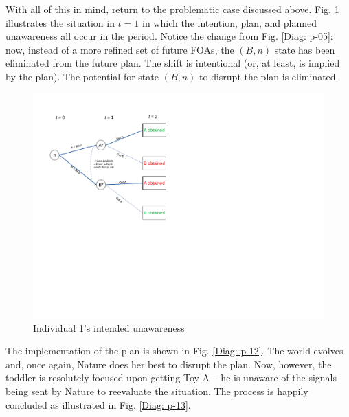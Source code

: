 \documentclass[
11pt,
titlepage,
reqno,
]{article}%
\theoremstyle{definition}
\begin{document}
With all of this in mind, return to the problematic case discussed above. Fig. \ref{Diag: p-11} illustrates the situation in $t=1$ in which the intention, plan, and planned unawareness all occur in the period. Notice the change from Fig. \ref{Diag: p-05}: now, instead of a more refined set of future FOAs, the  $(B,n)$ state has been eliminated from the future plan. The shift is intentional (or, at least, is implied by the plan). The potential for state $(B,n)$ to disrupt the plan is eliminated. 

\begin{figure}[h!]
	\centering
	\includegraphics*[page=11,trim = 0in 4in 3in 0in,scale=.65]{Awareness_Diagrams_All}
	\caption{Individual 1's intended unawareness\label{Diag: p-11}}%
\end{figure}

The implementation of the plan is shown in Fig. \ref{Diag: p-12}. The world evolves and, once again, Nature does her best to disrupt the plan. Now, however, the toddler is resolutely focused upon getting Toy A -- he is unaware of the signals being sent by Nature to reevaluate the situation. The process is happily concluded as illustrated in Fig. \ref{Diag: p-13}.
\end{document}
